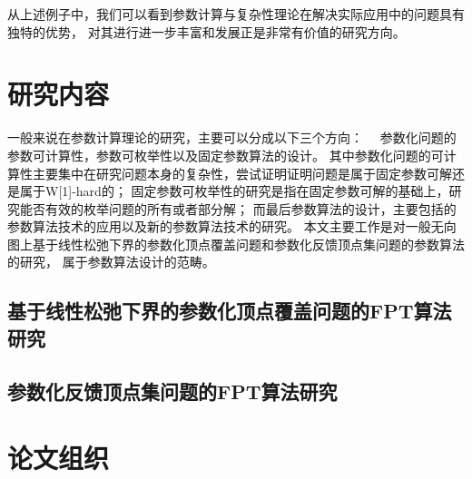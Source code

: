 从上述例子中，我们可以看到参数计算与复杂性理论在解决实际应用中的问题具有独特的优势，
对其进行进一步丰富和发展正是非常有价值的研究方向。



\section{研究内容}
一般来说在参数计算理论的研究，主要可以分成以下三个方向：　
参数化问题的参数可计算性，参数可枚举性以及固定参数算法的设计。
其中参数化问题的可计算性主要集中在研究问题本身的复杂性，尝试证明证明问题是属于固定参数可解还是属于W[1]-hard的；
固定参数可枚举性的研究是指在固定参数可解的基础上，研究能否有效的枚举问题的所有或者部分解；
而最后参数算法的设计，主要包括的参数算法技术的应用以及新的参数算法技术的研究。
本文主要工作是对一般无向图上基于线性松弛下界的参数化顶点覆盖问题和参数化反馈顶点集问题的参数算法的研究，
属于参数算法设计的范畴。

\subsection{基于线性松弛下界的参数化顶点覆盖问题的FPT算法研究}
\subsection{参数化反馈顶点集问题的FPT算法研究}
\section{论文组织}
